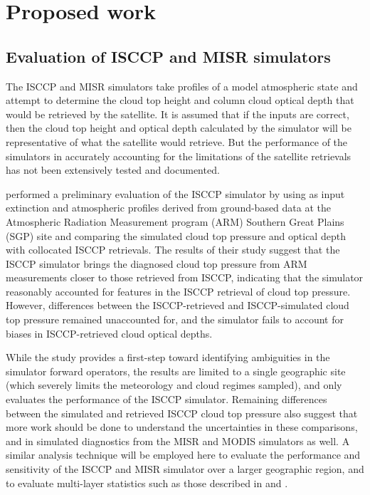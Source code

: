 \documentclass{article}
\begin{document}
\section{Proposed work}
\subsection{Evaluation of ISCCP and MISR simulators}
The ISCCP and MISR simulators take profiles of a model atmospheric state and attempt to determine the cloud top height and column cloud optical depth that would be retrieved by the satellite. It is assumed that if the inputs are correct, then the cloud top height and optical depth calculated by the simulator will be representative of what the satellite would retrieve. But the performance of the simulators in accurately accounting for the limitations of the satellite retrievals has not been extensively tested and documented.

\cite{mace_et_al_2010} performed a preliminary evaluation of the ISCCP simulator by using as input extinction and atmospheric profiles derived from ground-based data at the Atmospheric Radiation Measurement program (ARM) Southern Great Plains (SGP) site and comparing the simulated cloud top pressure and optical depth with collocated ISCCP retrievals. The results of their study suggest that the ISCCP simulator brings the diagnosed cloud top pressure from ARM measurements closer to those retrieved from ISCCP, indicating that the simulator reasonably accounted for features in the ISCCP retrieval of cloud top pressure. However, differences between the ISCCP-retrieved and ISCCP-simulated cloud top pressure remained unaccounted for, and the simulator fails to account for biases in ISCCP-retrieved cloud optical depths. 

While the \cite{mace_et_al_2010} study provides a first-step toward identifying ambiguities in the simulator forward operators, the results are limited to a single geographic site (which severely limits the meteorology and cloud regimes sampled), and only evaluates the performance of the ISCCP simulator. Remaining differences between the simulated and retrieved ISCCP cloud top pressure also suggest that more work should be done to understand the uncertainties in these comparisons, and in simulated diagnostics from the MISR and MODIS simulators as well. A similar analysis technique will be employed here to evaluate the performance and sensitivity of the ISCCP and MISR simulator over a larger geographic region, and to evaluate multi-layer statistics such as those described in \cite{marchand_et_al_2010} and \cite{marchand_and_ackerman_2010}.
\end{document}
